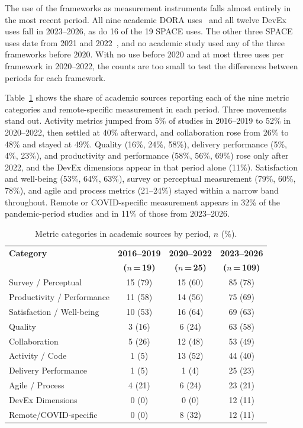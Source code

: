 \documentclass[preprint,number]{elsarticle}
\newcounter{study}
\begin{document}
The use of the frameworks as measurement instruments falls almost entirely in the most recent period. All nine academic DORA uses~\cite{P0470, P0003, P1261, P2008, P2013, P2014, P2017, P2026, P2043} and all twelve DevEx uses fall in 2023--2026, as do 16 of the 19 SPACE uses. The other three SPACE uses date from 2021 and 2022~\cite{P1259, P0061, P0549}, and no academic study used any of the three frameworks before 2020. With no use before 2020 and at most three uses per framework in 2020--2022, the counts are too small to test the differences between periods for each framework.

Table~\ref{tab:cat_period} shows the share of academic sources reporting each of the nine metric categories and remote-specific measurement in each period. Three movements stand out. Activity metrics jumped from 5\% of studies in 2016--2019 to 52\% in 2020--2022, then settled at 40\% afterward, and collaboration rose from 26\% to 48\% and stayed at 49\%. Quality (16\%, 24\%, 58\%), delivery performance (5\%, 4\%, 23\%), and productivity and performance (58\%, 56\%, 69\%) rose only after 2022, and the DevEx dimensions appear in that period alone (11\%). Satisfaction and well-being (53\%, 64\%, 63\%), survey or perceptual measurement (79\%, 60\%, 78\%), and agile and process metrics (21--24\%) stayed within a narrow band throughout. Remote or COVID-specific measurement appears in 32\% of the pandemic-period studies and in 11\% of those from 2023--2026.


\begin{table}[htbp]
\centering
\caption{Metric categories in academic sources by period, $n$ (\%).}
\label{tab:cat_period}
\footnotesize
\begin{tabular}{l c c c}
\toprule
\textbf{Category} & \textbf{2016--2019} & \textbf{2020--2022} & \textbf{2023--2026} \\
 & \textbf{($n$\,=\,19)} & \textbf{($n$\,=\,25)} & \textbf{($n$\,=\,109)} \\
\midrule
Survey / Perceptual        & 15 (79) & 15 (60) & 85 (78) \\
Productivity / Performance & 11 (58) & 14 (56) & 75 (69) \\
Satisfaction / Well-being   & 10 (53) & 16 (64) & 69 (63) \\
Quality                    & 3 (16)  & 6 (24)  & 63 (58) \\
Collaboration              & 5 (26)  & 12 (48) & 53 (49) \\
Activity / Code            & 1 (5)   & 13 (52) & 44 (40) \\
Delivery Performance       & 1 (5)   & 1 (4)   & 25 (23) \\
Agile / Process            & 4 (21)  & 6 (24)  & 23 (21) \\
DevEx Dimensions           & 0 (0)   & 0 (0)   & 12 (11) \\
\midrule
Remote/COVID-specific      & 0 (0)   & 8 (32)  & 12 (11) \\
\bottomrule
\end{tabular}
\end{table}
\end{document}

